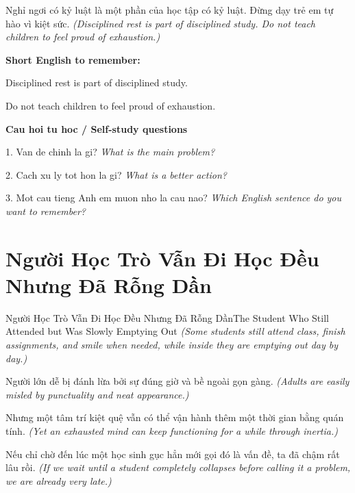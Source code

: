 \begin{baihoc}
Nghỉ ngơi có kỷ luật là một phần của học tập có kỷ luật. Đừng dạy trẻ em tự hào vì kiệt sức.
\textit{(Disciplined rest is part of disciplined study. Do not teach children to feel proud of exhaustion.)}
\end{baihoc}

\begin{ghinhoanh}
\textbf{Short English to remember:}

Disciplined rest is part of disciplined study.

Do not teach children to feel proud of exhaustion.

\end{ghinhoanh}

\begin{tuhocnhanh}
\textbf{Cau hoi tu hoc / Self-study questions}

1. Van de chinh la gi? \textit{What is the main problem?}

2. Cach xu ly tot hon la gi? \textit{What is a better action?}

3. Mot cau tieng Anh em muon nho la cau nao? \textit{Which English sentence do you want to remember?}
\end{tuhocnhanh}
\ngancach

\section{Người Học Trò Vẫn Đi Học Đều Nhưng Đã Rỗng Dần}
\begin{truyen}{Người Học Trò Vẫn Đi Học Đều Nhưng Đã Rỗng Dần}{The Student Who Still Attended but Was Slowly Emptying Out}
\textit{(Some students still attend class, finish assignments, and smile when needed, while inside they are emptying out day by day.)}

Người lớn dễ bị đánh lừa bởi sự đúng giờ và bề ngoài gọn gàng.
\textit{(Adults are easily misled by punctuality and neat appearance.)}

Nhưng một tâm trí kiệt quệ vẫn có thể vận hành thêm một thời gian bằng quán tính.
\textit{(Yet an exhausted mind can keep functioning for a while through inertia.)}

Nếu chỉ chờ đến lúc một học sinh gục hẳn mới gọi đó là vấn đề, ta đã chậm rất lâu rồi.
\textit{(If we wait until a student completely collapses before calling it a problem, we are already very late.)}

\end{truyen}

